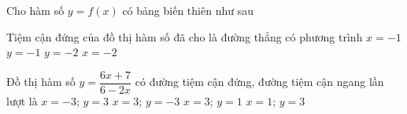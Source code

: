 \begin{ex}%
	Cho hàm số $y = f(x)$ có bảng biến thiên như  sau
	\begin{center}
	\end{center}
	Tiệm cận đứng của đồ thị hàm số đã cho là đường thẳng  có phương trình
	 \choice
		 {$x=-1$}
		{$y=-1$} 
		{$y=-2$} 
		{\True $x=-2$} 
\end{ex}

\begin{ex}%
	Đồ thị hàm số $y=\dfrac{6x+7}{6-2x}$ có đường tiệm cận đứng, đường tiệm cận  ngang lần lượt là
	 \choice
		 {$x=-3$; $y=3$}
		{\True  $x=3$; $y=-3$}
		{$x=3$;  $y=1$}
		{$x=1$;  $y=3$}
\end{ex}

